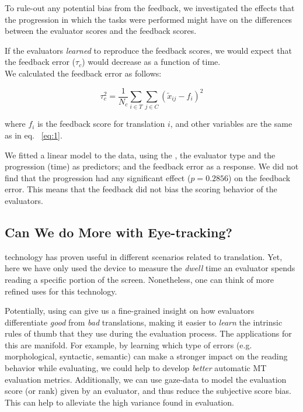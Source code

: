 To rule-out any potential bias from the feedback, we investigated the effects that the progression in which the tasks were performed might have on the differences between the evaluator scores and the feedback scores. %

If the evaluators \emph{learned} to reproduce the feedback scores, we would expect that the feedback error ($\tau_c$) would decrease as a function of time. \\
We calculated the feedback error as follows:


\begin{equation}
\tau_c^2 =   \frac{1}{N_c}\sum_{i \in T} \sum_{j\in C}(\tilde x_{ij} - f_i)^2
\end{equation}

\noindent where $f_i$ is the feedback score for translation $i$, and other variables are the same as in eq. ~\ref{eq:1}.

We fitted a linear model to the data, using the \gamet, the evaluator type and the progression (time) as predictors; and the feedback error as a response. We did not find that the progression had any significant effect ($p=0.2856$) on the feedback error.  This means that the feedback did not bias the scoring behavior of the evaluators.

\subsection{Can We do More with Eye-tracking?}
\Eye technology has proven useful in different scenarios related to translation.
Yet, here we have only used the \eye device to measure the \emph{dwell} time an evaluator spends reading a specific portion of the screen. Nonetheless, one can think of more refined uses for this technology.

Potentially, using \eye can give us a fine-grained insight on how evaluators differentiate \emph{good} from \emph{bad} translations, making it easier to \emph{learn} the intrinsic rules of thumb that they use during the evaluation process. The applications for this are manifold. For example, by learning which type of errors (e.g. morphological, syntactic, semantic) can make a stronger impact on the reading behavior while evaluating, we could help to develop \emph{better} automatic MT evaluation metrics. Additionally, we can use gaze-data to model the evaluation score (or rank) given by an evaluator, and thus reduce the subjective score bias. This can help to alleviate the high variance found in evaluation. 

